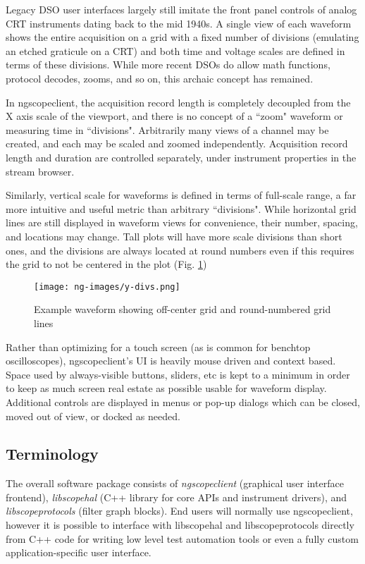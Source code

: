 Legacy DSO user interfaces largely still imitate the front panel controls of analog CRT instruments dating back to the
mid 1940s. A single view of each waveform shows the entire acquisition on a grid with a fixed number of divisions
(emulating an etched graticule on a CRT) and both time and voltage scales are defined in terms of these divisions.
While more recent DSOs do allow math functions, protocol decodes, zooms, and so on, this archaic concept has remained.

In ngscopeclient, the acquisition record length is completely decoupled from the X axis scale of the viewport, and
there is no concept of a ``zoom" waveform or measuring time in ``divisions". Arbitrarily many views of a channel may be
created, and each may be scaled and zoomed independently. Acquisition record length and duration are controlled
separately, under instrument properties in the stream browser.

Similarly, vertical scale for waveforms is defined in terms of full-scale range, a far more intuitive and useful metric
than arbitrary ``divisions". While horizontal grid lines are still displayed in waveform views for convenience, their
number, spacing, and locations may change. Tall plots will have more scale divisions than short ones, and the divisions
are always located at round numbers even if this requires the grid to not be centered in the plot (Fig. \ref{y-divs})

\begin{figure}[h]
\centering
\texttt{[image: ng-images/y-divs.png]}
\caption{Example waveform showing off-center grid and round-numbered grid lines}
\label{y-divs}
\end{figure}

Rather than optimizing for a touch screen (as is common for benchtop oscilloscopes), ngscopeclient's UI is
heavily mouse driven and context based. Space used by always-visible buttons, sliders, etc is kept to a minimum in
order to keep as much screen real estate as possible usable for waveform display. Additional controls are displayed in
menus or pop-up dialogs which can be closed, moved out of view, or docked as needed.

\subsection{Terminology}

The overall software package consists of \emph{ngscopeclient} (graphical user interface frontend), \emph{libscopehal}
(C++ library for core APIs and instrument drivers), and \emph{libscopeprotocols} (filter graph blocks). End users will
normally use ngscopeclient, however it is possible to interface with libscopehal and libscopeprotocols directly from
C++ code for writing low level test automation tools or even a fully custom application-specific user interface.

